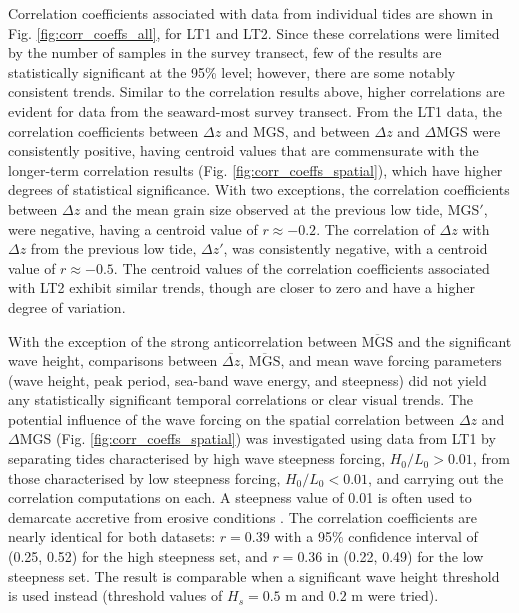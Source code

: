Correlation coefficients associated with data from individual tides are shown in Fig. \ref{fig:corr_coeffs_all}, for LT1 and LT2. Since these correlations were limited by the number of samples in the survey transect, few of the results are statistically significant at the 95\% level; however, there are some notably consistent trends. Similar to the correlation results above, higher correlations are evident for data from the seaward-most survey transect. From the LT1 data, the correlation coefficients between $\Delta z$ and MGS, and between $\Delta z$ and $\Delta$MGS were consistently positive, having centroid values that are commensurate with the longer-term correlation results (Fig. \ref{fig:corr_coeffs_spatial}), which have higher degrees of statistical significance. With two exceptions, the correlation coefficients between $\Delta z$ and the mean grain size observed at the previous low tide, MGS$'$, were negative, having a centroid value of $r\approx -0.2$. The correlation of $\Delta z$ with $\Delta z$ from the previous low tide, $\Delta z'$, was consistently negative, with a centroid value of $r\approx -0.5$. The centroid values of the correlation coefficients associated with LT2 exhibit similar trends, though are closer to zero and have a higher degree of variation. 

With the exception of the strong anticorrelation between $\overline{\mathrm{MGS}}$ and the significant wave height, comparisons between $\overline{\Delta z}$, $\overline{\mathrm{MGS}}$, and mean wave forcing parameters (wave height, peak period, sea-band wave energy, and steepness) did not yield any statistically significant temporal correlations or clear visual trends. The potential influence of the wave forcing on the spatial correlation between $\Delta z$ and $\Delta$MGS (Fig. \ref{fig:corr_coeffs_spatial}) was investigated using data from LT1 by separating tides characterised by high wave steepness forcing, $H_0/L_0 > 0.01$, from those characterised by low steepness forcing, $H_0/L_0 < 0.01$, and carrying out the correlation computations on each. A steepness value of 0.01 is often used to demarcate accretive from erosive conditions \citep[e.g.,][]{Masselink_etal2007}. The correlation coefficients are nearly identical for both datasets: $r=0.39$ with a 95\% confidence interval of (0.25, 0.52) for the high steepness set, and $r=0.36$ in (0.22, 0.49) for the low steepness set. The result is comparable when a significant wave height threshold is used instead (threshold values of $H_{s} = 0.5$ m and $0.2$ m were tried).


